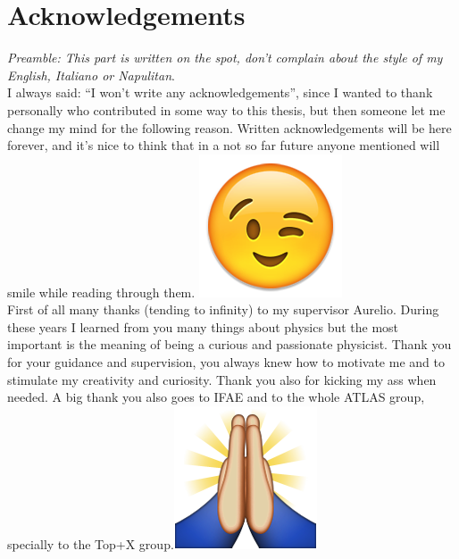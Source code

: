 \chapter*{Acknowledgements}

\textit{\small Preamble: This part is written on the spot, don't complain about the style of my English, Italiano or Napulitan}.\\


\noindent I always said: ``I won't write any acknowledgements'', since I wanted to thank personally who contributed in some way to this thesis, but then someone let me change my mind for the following reason. Written acknowledgements will be here forever, and it's nice to think that in a not so far future anyone mentioned will smile while reading through them. \includegraphics[height=1.5\fontcharht\font`A]{figures/ack/EmojiSmiley/EmojiSmiley-06.png}\\


\noindent First of all many thanks (tending to infinity) to my supervisor Aurelio. During these years I learned from you many things about physics but the most important is the meaning of being a curious and passionate physicist. Thank you for your guidance and supervision, you always knew how to motivate me and to stimulate my creativity and curiosity. Thank you also for kicking my ass when needed. A big thank you also goes to IFAE and to the whole ATLAS group, specially to the Top+X group.\includegraphics[height=1.5\fontcharht\font`A]{figures/ack/EmojiSmiley/EmojiSmiley-120.png}\\


